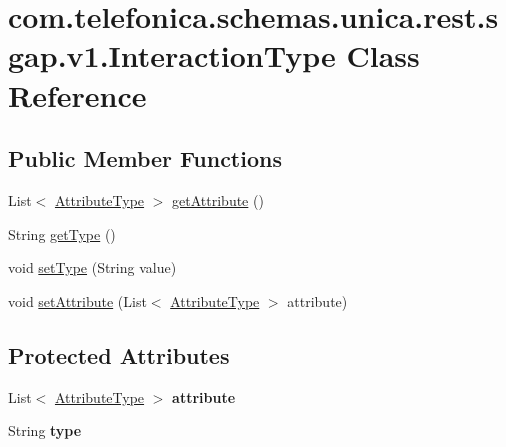 \hypertarget{classcom_1_1telefonica_1_1schemas_1_1unica_1_1rest_1_1sgap_1_1v1_1_1InteractionType}{
\section{com.telefonica.schemas.unica.rest.sgap.v1.InteractionType Class Reference}
\label{classcom_1_1telefonica_1_1schemas_1_1unica_1_1rest_1_1sgap_1_1v1_1_1InteractionType}
}
\subsection*{Public Member Functions}
\begin{DoxyCompactItemize}
\item 
List$<$ \hyperlink{classcom_1_1telefonica_1_1schemas_1_1unica_1_1rest_1_1sgap_1_1v1_1_1AttributeType}{AttributeType} $>$ \hyperlink{classcom_1_1telefonica_1_1schemas_1_1unica_1_1rest_1_1sgap_1_1v1_1_1InteractionType_a45fb86616fcff164aec9b716a8a2df39}{getAttribute} ()
\item 
String \hyperlink{classcom_1_1telefonica_1_1schemas_1_1unica_1_1rest_1_1sgap_1_1v1_1_1InteractionType_ae5042eac0165e37e5db67d2c634f7bcd}{getType} ()
\item 
void \hyperlink{classcom_1_1telefonica_1_1schemas_1_1unica_1_1rest_1_1sgap_1_1v1_1_1InteractionType_a95a0428488c2b30868877e7b27fdd063}{setType} (String value)
\item 
void \hyperlink{classcom_1_1telefonica_1_1schemas_1_1unica_1_1rest_1_1sgap_1_1v1_1_1InteractionType_a6af798c8385bcdff4affa5df3ce2f77a}{setAttribute} (List$<$ \hyperlink{classcom_1_1telefonica_1_1schemas_1_1unica_1_1rest_1_1sgap_1_1v1_1_1AttributeType}{AttributeType} $>$ attribute)
\end{DoxyCompactItemize}
\subsection*{Protected Attributes}
\begin{DoxyCompactItemize}
\item 
\hypertarget{classcom_1_1telefonica_1_1schemas_1_1unica_1_1rest_1_1sgap_1_1v1_1_1InteractionType_a8bb37c5ae90b649131a01920921b530c}{
List$<$ \hyperlink{classcom_1_1telefonica_1_1schemas_1_1unica_1_1rest_1_1sgap_1_1v1_1_1AttributeType}{AttributeType} $>$ {\bfseries attribute}}
\label{classcom_1_1telefonica_1_1schemas_1_1unica_1_1rest_1_1sgap_1_1v1_1_1InteractionType_a8bb37c5ae90b649131a01920921b530c}

\item 
\hypertarget{classcom_1_1telefonica_1_1schemas_1_1unica_1_1rest_1_1sgap_1_1v1_1_1InteractionType_aeeb989fabdf2b2a21de22d7a12e2b682}{
String {\bfseries type}}
\label{classcom_1_1telefonica_1_1schemas_1_1unica_1_1rest_1_1sgap_1_1v1_1_1InteractionType_aeeb989fabdf2b2a21de22d7a12e2b682}

\end{DoxyCompactItemize}


